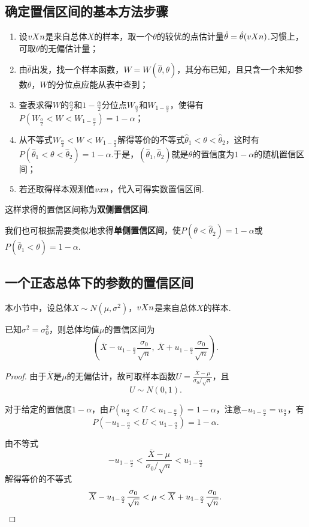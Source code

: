 \subsection{确定置信区间的基本方法步骤}
\begin{enumerate}
\item 设\(v{X}{n}\)是来自总体\(X\)的样本，取一个\(\theta\)的较优的点估计量\(\hat{\theta}=\hat{\theta}(v{X}{n})\).习惯上，可取\(\theta\)的无偏估计量；
\item 由\(\hat{\theta}\)出发，找一个样本函数，\(W=W(\hat{\theta},\theta)\)，其分布已知，且只含一个未知参数\(\theta\)，\(W\)的分位点应能从表中查到；
\item 查表求得\(W\)的\(\frac{\alpha}{2}\)和\(1-\frac{\alpha}{2}\)分位点\(W_{\frac{\alpha}{2}}\)和\(W_{1-\frac{\alpha}{2}}\)，使得有\(P(W_{\frac{\alpha}{2}}<W<W_{1-\frac{\alpha}{2}})=1-\alpha\)；
\item 从不等式\(W_{\frac{\alpha}{2}}<W<W_{1-\frac{\alpha}{2}}\)解得等价的不等式\(\hat{\theta}_1 < \theta < \hat{\theta}_2\)，这时有\(P(\hat{\theta}_1 < \theta < \hat{\theta}_2) = 1-\alpha\).于是，\((\hat{\theta}_1,\hat{\theta}_2)\)就是\(\theta\)的置信度为\(1-\alpha\)的随机置信区间；
\item 若还取得样本观测值\(v{x}{n}\)，代入可得实数置信区间.
\end{enumerate}

这样求得的置信区间称为\textbf{双侧置信区间}.

我们也可根据需要类似地求得\textbf{单侧置信区间}，使\(P(\theta<\hat{\theta}_2)=1-\alpha\)或\(P(\hat{\theta}_1<\theta)=1-\alpha\).

\subsection{一个正态总体下的参数的置信区间}
本小节中，设总体\(X \sim N(\mu,\sigma^2)\)，\(v{X}{n}\)是来自总体\(X\)的样本.
\begin{example}
已知\(\sigma^2=\sigma_0^2\)，则总体均值\(\mu\)的置信区间为\[
\left( \overline{X} - u_{1-\frac{\alpha}{2}} \frac{\sigma_0}{\sqrt{n}},\ \overline{X} + u_{1-\frac{\alpha}{2}} \frac{\sigma_0}{\sqrt{n}} \right).
\]
\begin{proof}
\def\U{\frac{\overline{X}-\mu}{\sigma_0 / \sqrt{n}}}
由于\(\overline{X}\)是\(\mu\)的无偏估计，故可取样本函数\(U=\U\)，且\[
U \sim N(0,1).
\]

对于给定的置信度\(1-\alpha\)，由\(P(u_{\frac{\alpha}{2}} < U < u_{1-\frac{\alpha}{2}})=1-\alpha\)，注意\(-u_{1-\frac{\alpha}{2}} = u_{\frac{\alpha}{2}}\)，有\[
P(-u_{1-\frac{\alpha}{2}} < U < u_{1-\frac{\alpha}{2}}) = 1-\alpha.
\]

由不等式\[
-u_{1-\frac{\alpha}{2}} < \U < u_{1-\frac{\alpha}{2}}
\]解得等价的不等式\[
\overline{X} - u_{1-\frac{\alpha}{2}} \frac{\sigma_0}{\sqrt{n}} < \mu < \overline{X} + u_{1-\frac{\alpha}{2}} \frac{\sigma_0}{\sqrt{n}}.
\qedhere
\]
\end{proof}
\end{example}

